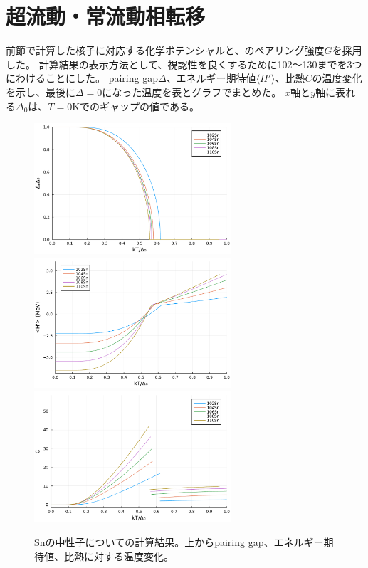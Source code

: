 \documentclass[a4paper,11pt]{jsreport}
\begin{document}
  \section{超流動・常流動相転移}
  前節で計算した核子に対応する化学ポテンシャルと、のペアリング強度\(G\)を採用した。
  計算結果の表示方法として、視認性を良くするために102～130までを3つにわけることにした。
  pairing gap\(\Delta\)、エネルギー期待値\(\langle H'\rangle\)、比熱\(C\)の温度変化を示し、最後に\(\Delta=0\)になった温度を表とグラフでまとめた。
  $x$軸と$y$軸に表れる\(\Delta_0\)は、\(T=0\)Kでのギャップの値である。
  \begin{figure}[H]
    \centering
    \includegraphics[width=0.65\textwidth]{main_fig/102d.pdf}
    \includegraphics[width=0.65\textwidth]{main_fig/102H.pdf}
    \includegraphics[width=0.65\textwidth]{main_fig/102C.pdf}
    \caption{Snの中性子についての計算結果。上からpairing gap、エネルギー期待値、比熱に対する温度変化。}
  \end{figure}
\end{document}
